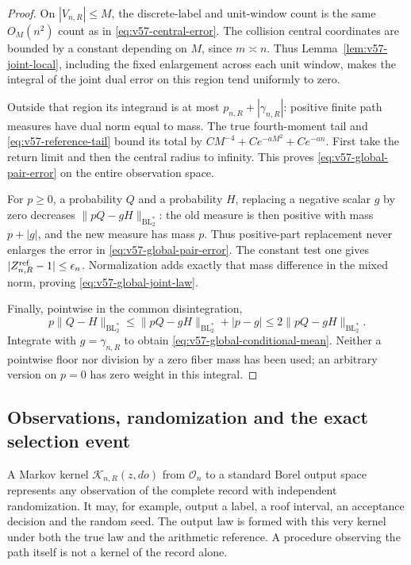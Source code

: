 \begin{proof}
On $|V_{n,R}|\le M$, the discrete-label and unit-window count is the
same $O_M(n^2)$ count as in \eqref{eq:v57-central-error}. The collision
central coordinates are bounded by a constant depending on $M$,
since $m\asymp n$. Thus Lemma~\ref{lem:v57-joint-local}, including the
fixed enlargement across each unit window, makes the integral of the
joint dual error on this region tend uniformly to zero.

Outside that region its integrand is at most
$p_{n,R}+|\gamma_{n,R}|$: positive finite path measures have dual
norm equal to mass. The true fourth-moment tail and
\eqref{eq:v57-reference-tail} bound its total by
$CM^{-4}+Ce^{-aM^2}+Ce^{-an}$. First take the return limit and then
the central radius to infinity. This proves
\eqref{eq:v57-global-pair-error} on the entire observation space.

For $p\ge0$, a probability $Q$ and a probability $H$, replacing a
negative scalar $g$ by zero decreases
$\|pQ-gH\|_{\mathrm{BL}_2^*}$: the old measure is then positive
with mass $p+|g|$, and the new measure has mass $p$. Thus positive-part
replacement never enlarges the error in
\eqref{eq:v57-global-pair-error}. The constant test one gives
$|Z_{n,R}^{\rm ref}-1|\le\epsilon_n$. Normalization adds exactly
that mass difference in the mixed norm, proving
\eqref{eq:v57-global-joint-law}.

Finally, pointwise in the common disintegration,
\[
 p\|Q-H\|_{\mathrm{BL}_2^*}
 \le\|pQ-gH\|_{\mathrm{BL}_2^*}+|p-g|
 \le2\|pQ-gH\|_{\mathrm{BL}_2^*}.
\]
Integrate with $g=\gamma_{n,R}$ to obtain
\eqref{eq:v57-global-conditional-mean}. Neither a pointwise floor
nor division by a zero fiber mass has been used; an arbitrary version
on $p=0$ has zero weight in this integral.
\end{proof}

\subsection{Observations, randomization and the exact selection event}
A Markov kernel $\mathscr K_{n,R}(z,do)$ from $\mathcal O_n$ to a
standard Borel output space represents any observation of the complete
record with independent randomization. It may, for example, output a
label, a roof interval, an acceptance decision and the random seed.
The output law is formed with this very kernel under both the true
law and the arithmetic reference. A procedure observing the path
itself is not a kernel of the record alone.


